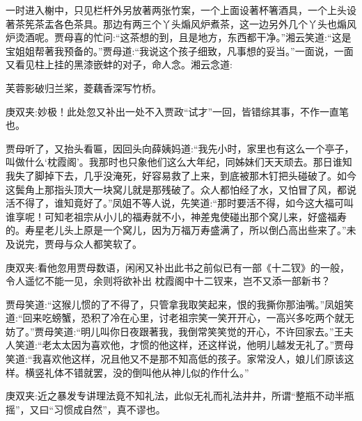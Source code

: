 \begin{parag}
    一时进入榭中，只见栏杆外另放著两张竹案，一个上面设著杯箸酒具，一个上头设著茶筅茶盂各色茶具。那边有两三个丫头煽风炉煮茶，这一边另外几个丫头也煽风炉烫酒呢。贾母喜的忙问:“这茶想的到，且是地方，东西都干净。”湘云笑道:“这是宝姐姐帮著我预备的。”贾母道:“我说这个孩子细致，凡事想的妥当。”一面说，一面又看见柱上挂的黑漆嵌蚌的对子，命人念。湘云念道:
\end{parag}


\begin{poem}
    \begin{pl}芙蓉影破归兰桨，菱藕香深写竹桥。\end{pl}
    \begin{note}庚双夹:妙极！此处忽又补出一处不入贾政“试才”一回，皆错综其事，不作一直笔也。\end{note}
\end{poem}


\begin{parag}
    贾母听了，又抬头看匾，因回头向薛姨妈道:“我先小时，家里也有这么一个亭子，叫做什么‘枕霞阁’。我那时也只象他们这么大年纪，同姊妹们天天顽去。那日谁知我失了脚掉下去，几乎没淹死，好容易救了上来，到底被那木钉把头碰破了。如今这鬓角上那指头顶大一块窝儿就是那残破了。众人都怕经了水，又怕冒了风，都说活不得了，谁知竟好了。”凤姐不等人说，先笑道:“那时要活不得，如今这大福可叫谁享呢！可知老祖宗从小儿的福寿就不小，神差鬼使碰出那个窝儿来，好盛福寿的。寿星老儿头上原是一个窝儿，因为万福万寿盛满了，所以倒凸高出些来了。”未及说完，贾母与众人都笑软了。\begin{note}庚双夹:看他忽用贾母数语，闲闲又补出此书之前似已有一部《十二钗》的一般，令人遥忆不能一见，余则将欲补出 枕霞阁中十二钗来，岂不又添一部新书？\end{note}贾母笑道:“这猴儿惯的了不得了，只管拿我取笑起来，恨的我撕你那油嘴。”凤姐笑道:“回来吃螃蟹，恐积了冷在心里，讨老祖宗笑一笑开开心，一高兴多吃两个就无妨了。”贾母笑道:“明儿叫你日夜跟著我，我倒常笑笑觉的开心，不许回家去。”王夫人笑道:“老太太因为喜欢他，才惯的他这样，还这样说，他明儿越发无礼了。”贾母笑道:“我喜欢他这样，况且他又不是那不知高低的孩子。家常没人，娘儿们原该这样。横竖礼体不错就罢，没的倒叫他从神儿似的作什么。”\begin{note}庚双夹:近之暴发专讲理法竟不知礼法，此似无礼而礼法井井，所谓“整瓶不动半瓶摇”，又曰“习惯成自然”，真不谬也。\end{note}
\end{parag}


